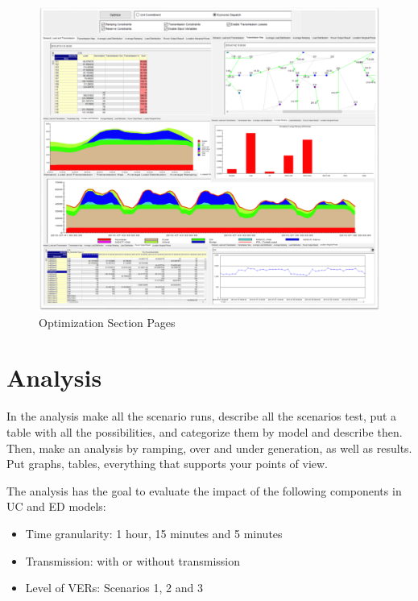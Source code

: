 \documentclass[12pt,LUDisStyle,twosided]{book}
\begin{document}
\begin{figure}[h] 
	\begin{center}
		\includegraphics[width=\textwidth,height=\textheight,keepaspectratio]{aimmsOptimizationSectionPages.png}
	  	\caption{Optimization Section Pages}
     	\label{fig:optimizationSectionPages}
	\end{center}
\end{figure}



\chapter{Analysis}

In the analysis make all the scenario runs, describe all the scenarios test, put a table with all the possibilities, and categorize them by model and describe then. Then, make an analysis by ramping, over and under generation, as well as results. Put graphs, tables, everything that supports your points of view.

The analysis has the goal to evaluate the impact of the following components in UC and ED models:

\begin{itemize}
\item Time granularity: 1 hour, 15 minutes and 5 minutes
\item Transmission: with or without transmission
\item Level of VERs: Scenarios 1, 2 and 3
\end{itemize}
\end{document}
